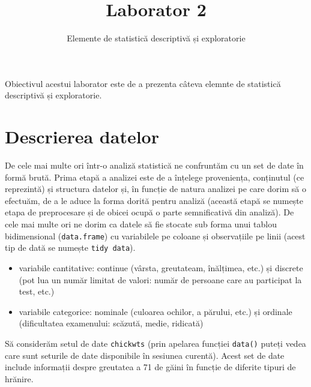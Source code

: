 \documentclass[]{article}
\title{Laborator 2}
\subtitle{Elemente de statistică descriptivă și exploratorie}
\author{}
\date{}
\providecommand{\tightlist}{%
  \setlength{\itemsep}{0pt}\setlength{\parskip}{0pt}}
\begin{document}
\maketitle

\thispagestyle{fancy}

Obiectivul acestui laborator este de a prezenta câteva elemnte de
statistică descriptivă și exploratorie.

\section{Descrierea datelor}\label{descrierea-datelor}

De cele mai multe ori într-o analiză statistică ne confruntăm cu un set
de date în formă brută. Prima etapă a analizei este de a înțelege
proveniența, conținutul (ce reprezintă) și structura datelor și, în
funcție de natura analizei pe care dorim să o efectuăm, de a le aduce la
forma dorită pentru analiză (această etapă se numește etapa de
preprocesare și de obicei ocupă o parte semnificativă din analiză). De
cele mai multe ori ne dorim ca datele să fie stocate sub forma unui
tablou bidimensional (\texttt{data.frame}) cu variabilele pe coloane și
observațiile pe linii (acest tip de dată se numește
\texttt{tidy\ data}).

\begin{itemize}
\tightlist
\item
  variabile cantitative: continue (vârsta, greutateam, înălțimea, etc.)
  și discrete (pot lua un număr limitat de valori: număr de persoane
  care au participat la test, etc.)
\item
  variabile categorice: nominale (culoarea ochilor, a părului, etc.) și
  ordinale (dificultatea examenului: scăzută, medie, ridicată)
\end{itemize}

Să considerăm setul de date \texttt{chickwts} (prin apelarea funcției
\texttt{data()} puteți vedea care sunt seturile de date disponibile în
sesiunea curentă). Acest set de date include informații despre greutatea
a 71 de găini în funcție de diferite tipuri de hrănire.
\end{document}

